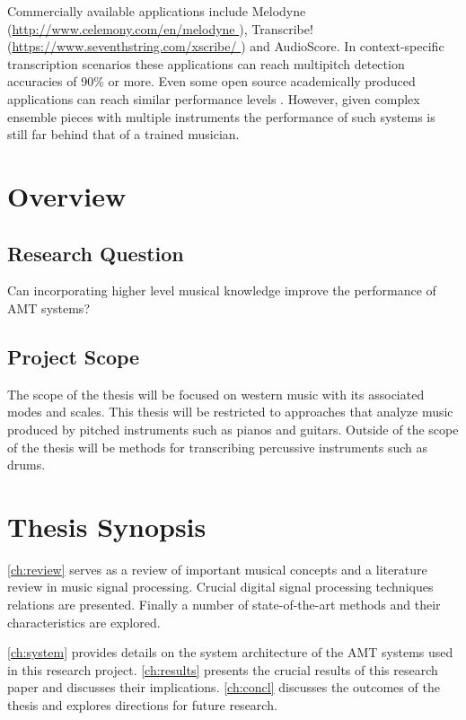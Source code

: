 Commercially available applications include Melodyne (\url{http://www.celemony.com/en/melodyne }), Transcribe!(\url{https://www.seventhstring.com/xscribe/ })  and AudioScore.
In context-specific transcription scenarios these applications can reach multipitch detection accuracies of 90\% or more. Even some open source
academically produced applications can reach similar performance levels \cite{context-dependent2016:Cogliati}.
However, given complex ensemble pieces with multiple instruments the performance of such systems
is still far behind that of a trained musician.

\section{Overview}

\subsection{Research Question}

Can incorporating higher level musical knowledge
improve the performance of \ac{AMT} systems?

\subsection{Project Scope}

The scope of the thesis will be focused on western music with its associated modes
and scales. This thesis will be restricted to approaches that analyze music
produced by pitched instruments such as pianos and guitars. Outside of the scope
of the thesis will be methods for transcribing percussive instruments such as
drums.

\section{Thesis Synopsis}

\autoref{ch:review} serves as a review of important musical concepts and a
literature review in music signal processing. Crucial digital signal processing
techniques relations are presented. Finally a number of state-of-the-art methods and their characteristics are explored.

\autoref{ch:system} provides details on the system architecture of the AMT
systems used in this research project. \autoref{ch:results} presents the crucial
results of this research paper and discusses their implications.
\autoref{ch:concl} discusses the outcomes of the thesis and explores directions
for future research.

